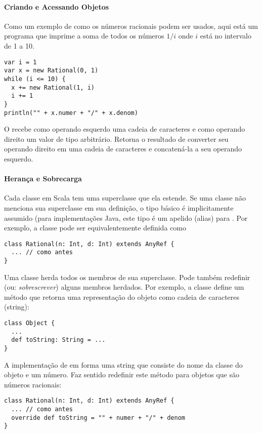 \paragraph{Criando e Acessando Objetos}
Como um exemplo de como os n\'{u}meros racionais podem ser usados, aqui est\'{a} um programa 
que imprime a soma de todos os n\'{u}meros $1/i$ onde $i$ est\'{a} no intervalo de 1 a 10. 
\begin{lstlisting}
var i = 1
var x = new Rational(0, 1)
while (i <= 10) {
  x += new Rational(1, i)
  i += 1
}
println("" + x.numer + "/" + x.denom)
\end{lstlisting}

O \code{+} recebe como operando esquerdo uma cadeia de caracteres e como 
operando direito um valor de tipo arbitr\'{a}rio. Retorna o resultado de 
converter seu operando direito em uma cadeia de caracteres e concaten\'{a}-la 
a seu operando esquerdo.   

\paragraph{Heran\c{c}a e Sobrecarga}
Cada classe em Scala tem uma superclasse que ela estende.
Se uma classe n\~{a}o menciona sua superclasse em sua defini\c{c}\~{a}o, o tipo b\'{a}sico 
 \'{e} implicitamente assumido (para implementa\c{c}\~{o}es Java, este
tipo \'{e} um apelido (alias) para . Por exemplo, a classe 
 pode ser equivalentemente definida como      
\begin{lstlisting}
class Rational(n: Int, d: Int) extends AnyRef {
  ... // como antes
}
\end{lstlisting}

Uma classe herda todos os membros de sua superclasse. Pode tamb\'{e}m redefinir
(ou: {\em sobrescrever}) alguns membros herdados. Por exemplo, a classe 
 define um m\'{e}todo  que retorna uma 
representa\c{c}\~{a}o do objeto como cadeia de caracteres (string): 
\begin{lstlisting}
class Object {
  ...
  def toString: String = ...
}
\end{lstlisting}

A implementa\c{c}\~{a}o de  em  forma uma string que 
consiste do nome da classe do objeto e um n\'{u}mero. Faz sentido redefinir este
m\'{e}todo para objetos que s\~{a}o n\'{u}meros racionais:  
\begin{lstlisting}
class Rational(n: Int, d: Int) extends AnyRef {
  ... // como antes
  override def toString = "" + numer + "/" + denom
}
\end{lstlisting}

